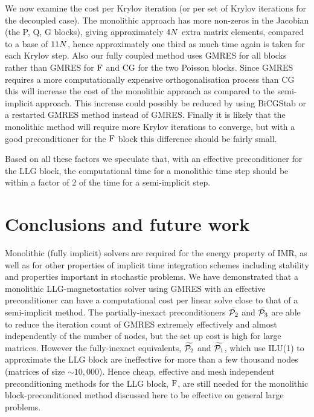We now examine the cost per Krylov iteration (or per set of Krylov iterations for the decoupled case).
The monolithic approach has more non-zeros in the Jacobian (the P, Q, G blocks), giving approximately $4 N$ extra matrix elements, compared to a base of $11 N$, hence approximately one third as much time again is taken for each Krylov step.
Also our fully coupled method uses GMRES for all blocks rather than GMRES for $\mathrm{F}$ and CG for the two Poisson blocks.
Since GMRES requires a more computationally expensive orthogonalisation process than CG this will increase the cost of the monolithic approach as compared to the semi-implicit approach.
This increase could possibly be reduced by using BiCGStab or a restarted GMRES method instead of GMRES.
Finally it is likely that the monolithic method will require more Krylov iterations to converge, but with a good preconditioner for the $\mathrm{F}$ block this difference should be fairly small.

Based on all these factors we speculate that, with an effective preconditioner for the LLG block, the computational time for a monolithic time step should be within a factor of 2 of the time for a semi-implicit step.


\section{Conclusions and future work}

Monolithic (fully implicit) solvers are required for the energy property of IMR, as well as for other properties of implicit time integration schemes including stability and properties important in stochastic problems.
We have demonstrated that a monolithic LLG-magnetostatics solver using GMRES with an effective preconditioner can have a computational cost per linear solve close to that of a semi-implicit method.
The partially-inexact preconditioners $\bar{\mathcal{P}_2}$ and $\bar{\mathcal{P}_3}$ are able to reduce the iteration count of GMRES extremely effectively and almost independently of the number of nodes, but the set up cost is high for large matrices.
However the fully-inexact equivalents, $\widetilde{\mathcal{P}_2}$ and  $\widetilde{\mathcal{P}_1}$, which use ILU(1) to approximate the LLG block are ineffective for more than a few thousand nodes (\ie matrices of size $\sim 10,000$).
Hence cheap, effective and mesh independent preconditioning methods for the LLG block, $\mathrm{F}$, are still needed for the monolithic block-preconditioned method discussed here to be effective on general large problems.

